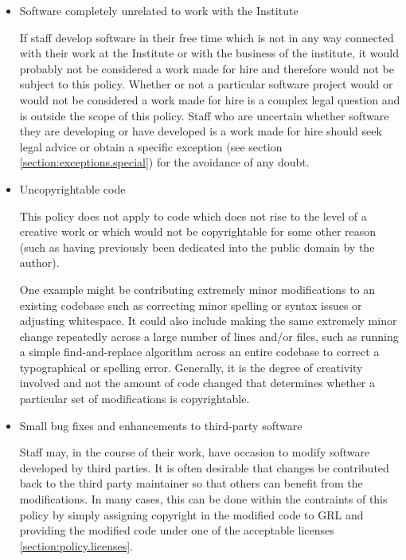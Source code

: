\documentclass[10pt,a4paper]{article}
\begin{document}
\begin{itemize}

\item Software completely unrelated to work with the Institute

\par If staff develop software in their free time which is not in any way connected 
with their work at the Institute or with the business of the institute, it would 
probably not be considered a work made for hire and therefore would not be 
subject to this policy. Whether or not a particular software project would or 
would not be considered a work made for hire is a complex legal question and 
is outside the scope of this policy. Staff who are uncertain whether software 
they are developing or have developed is a work made for hire should seek 
legal advice or obtain a specific exception (see section \ref{section:exceptions.special}) 
for the avoidance of any doubt. 

\item Uncopyrightable code

\par This policy does not apply to code which does not rise to the level of a 
creative work or which would not be copyrightable for some other reason 
(such as having previously been dedicated into the public domain by the author). 

\par One example might be contributing extremely minor modifications to an existing 
codebase such as correcting minor spelling or syntax issues or adjusting whitespace. 
It could also include making the same extremely minor change repeatedly across a 
large number of lines and/or files, such as running a simple find-and-replace 
algorithm across an entire codebase to correct a typographical or spelling error. 
Generally, it is the degree of creativity involved and not the amount of code changed 
that determines whether a particular set of modifications is copyrightable. 


\item Small bug fixes and enhancements to third-party software

\par Staff may, in the course of their work, have occasion to modify software 
developed by third parties. It is often desirable that changes be contributed 
back to the third party maintainer so that others can benefit from the modifications. 
In many cases, this can be done within the contraints of this policy by simply 
assigning copyright in the modified code to GRL and providing the modified code 
under one of the acceptable licenses \ref{section:policy.licenses}. 


\end{itemize}
\end{document}
